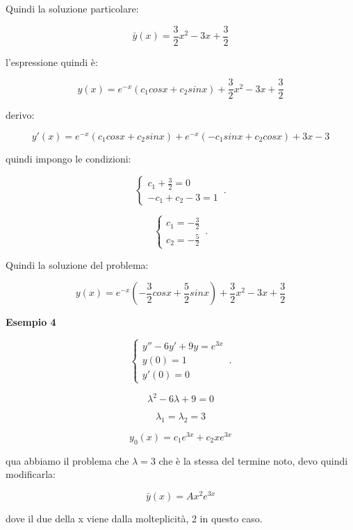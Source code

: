 \documentclass[11pt]{article}
\begin{document}
Quindi la soluzione particolare:

\[
    \bar{y} (x) = \frac{3}{2}x^{2}-3x+\frac{3}{2}
\]


l'espressione quindi è:

\[
    y(x) = e ^{-x}(c_1 cosx + c_2 sinx ) + \frac{3}{2}x^{2}-3x+\frac{3}{2}
\]

derivo:

\[
    y'(x) = e ^{-x}(c_1 cosx+ c_2 sinx) + e ^{-x}(-c_1sinx+c_2 cosx) +3x -3
\]

quindi impongo le condizioni:

    \begin{equation}
        \begin{cases}
            c_1 +\frac{3}{2}=0\\
            -c_1+c_2 -3 = 1
        \end{cases}\,.
    \end{equation}

    \begin{equation}
        \begin{cases}
            c_1=-\frac{3}{2}\\
            c_2=-\frac{5}{2}
        \end{cases}\,.
    \end{equation}

Quindi la soluzione del problema:

\[
    y(x) = e ^{-x}(-\frac{3}{2}cosx + \frac{5}{2} sinx) + \frac{3}{2}x^{2}-3x + \frac{3}{2}
\]

\textbf{Esempio 4} 

    \begin{equation}
        \begin{cases}
            y''-6y' + 9y = e ^{3x}\\
            y(0) = 1\\
            y'(0) = 0
        \end{cases}\,.
    \end{equation}

\[
    \lambda^{2} -6 \lambda + 9 = 0
\]

\[
    \lambda_1=\lambda_2=3
\]

\[
    y_0(x)  = c_1 e ^{3x}+ c_2 x e ^{3x}
\]

qua abbiamo il problema che $\lambda=3$ che è la stessa del termine noto, devo quindi modificarla:

\[
    \bar{y} (x) = A x^{2}e ^{3x}
\]

dove il due della x viene dalla molteplicità, 2 in questo caso.
\end{document}
